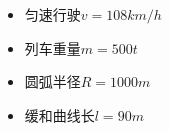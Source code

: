 \begin{center}
\end{center}

\begin{itemize}
  \item 匀速行驶$v=108km/h$
  \item 列车重量$m=500t$
  \item 圆弧半径$R=1000m$
  \item 缓和曲线长$l=90m$
\end{itemize}

